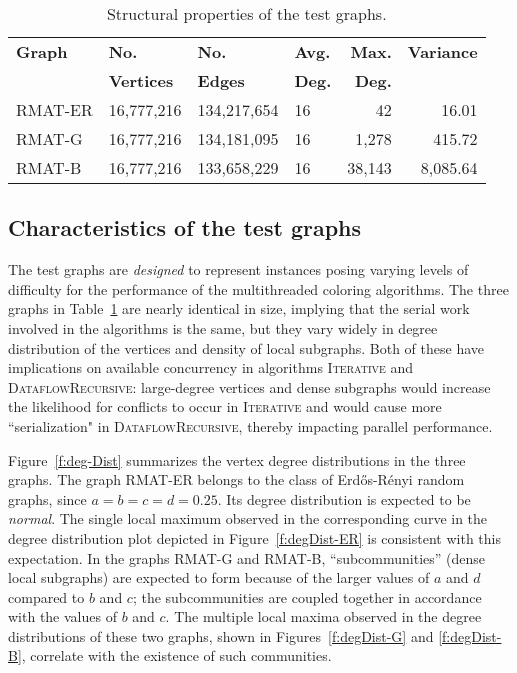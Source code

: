 \documentclass{article}
\begin{document}
\begin{table}
\begin{footnotesize}
\centering
\begin{tabular}{|l|l|l|l|r|r|}
\hline
\textbf{Graph} & \textbf{No. } & \textbf{No.} &  \textbf{Avg.} &
\textbf{Max.} & \textbf{Variance}  \\ 
& \textbf{Vertices} & \textbf{Edges} &  \textbf{Deg.} &
\textbf{Deg.} & \\ \hline \hline
RMAT-ER		&  16,777,216 &    134,217,654 &  16 & 42     &  16.01    \\ \hline
RMAT-G	        &  16,777,216 &    134,181,095 &  16 & 1,278  &  415.72   \\ \hline
RMAT-B	        &  16,777,216 &    133,658,229 &  16 & 38,143 &  8,085.64 \\ \hline
\end{tabular}
\caption{Structural properties of the test graphs.}
\label{t:prop}
\end{footnotesize}
\end{table}


\subsection{Characteristics of the test graphs}


The test graphs are {\em designed} to represent instances 
posing varying levels of difficulty for the performance of the multithreaded coloring algorithms. 
The three graphs in Table~\ref{t:prop} are nearly identical in size, 
implying that the serial work involved in the algorithms is the same, 
but they vary widely in degree distribution of the vertices and
density of local subgraphs. Both of these have implications on available concurrency in algorithms \textsc{Iterative} and \textsc{DataflowRecursive}: 
large-degree vertices and dense subgraphs would increase the likelihood for conflicts to occur 
in \textsc{Iterative} and would cause more ``serialization" in \textsc{DataflowRecursive}, 
thereby impacting parallel performance.

Figure~\ref{f:deg-Dist} summarizes the vertex degree distributions in the three graphs.
The graph RMAT-ER belongs to the class of Erd\H os-R\'enyi random graphs,
since $a=b=c=d=0.25$. Its degree distribution is expected to be {\em normal}.
The single local maximum observed in the corresponding curve in the degree distribution plot
depicted in Figure~\ref{f:degDist-ER} is consistent with this expectation.
In the graphs RMAT-G and RMAT-B, ``subcommunities'' (dense local subgraphs)  
are expected to form because of the larger values of $a$ and $d$ 
compared to $b$ and $c$; the subcommunities are coupled together 
in accordance with the values of $b$ and $c$.
The multiple local maxima observed in the degree distributions of these two graphs,
shown in Figures~\ref{f:degDist-G} and \ref{f:degDist-B}, 
correlate with the existence of such communities.
\end{document}
